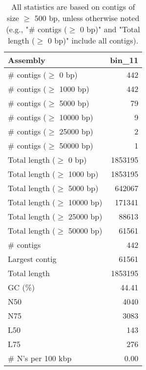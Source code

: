 \documentclass[12pt,a4paper]{article}
\begin{document}
\begin{table}[ht]
\begin{center}
\caption{All statistics are based on contigs of size $\geq$ 500 bp, unless otherwise noted (e.g., "\# contigs ($\geq$ 0 bp)" and "Total length ($\geq$ 0 bp)" include all contigs).}
\begin{tabular}{|l*{1}{|r}|}
\hline
Assembly & bin\_11 \\ \hline
\# contigs ($\geq$ 0 bp) & 442 \\ \hline
\# contigs ($\geq$ 1000 bp) & 442 \\ \hline
\# contigs ($\geq$ 5000 bp) & 79 \\ \hline
\# contigs ($\geq$ 10000 bp) & 9 \\ \hline
\# contigs ($\geq$ 25000 bp) & 2 \\ \hline
\# contigs ($\geq$ 50000 bp) & 1 \\ \hline
Total length ($\geq$ 0 bp) & 1853195 \\ \hline
Total length ($\geq$ 1000 bp) & 1853195 \\ \hline
Total length ($\geq$ 5000 bp) & 642067 \\ \hline
Total length ($\geq$ 10000 bp) & 171341 \\ \hline
Total length ($\geq$ 25000 bp) & 88613 \\ \hline
Total length ($\geq$ 50000 bp) & 61561 \\ \hline
\# contigs & 442 \\ \hline
Largest contig & 61561 \\ \hline
Total length & 1853195 \\ \hline
GC (\%) & 44.41 \\ \hline
N50 & 4040 \\ \hline
N75 & 3083 \\ \hline
L50 & 143 \\ \hline
L75 & 276 \\ \hline
\# N's per 100 kbp & 0.00 \\ \hline
\end{tabular}
\end{center}
\end{table}
\end{document}
